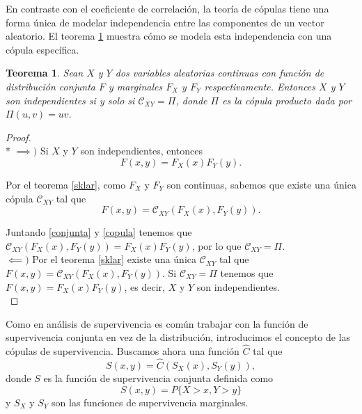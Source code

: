 \documentclass[11pt,a4paper]{article}
\newcommand{\C}{\mathcal{C}}
\newtheorem{theorem}{Teorema}[section]
\begin{document}
En contraste con el coeficiente de correlación, la teoría de cópulas tiene una forma única de modelar independencia entre las componentes de un vector aleatorio. El teorema \ref{independencia} muestra cómo se modela esta independencia con una cópula específica.\\

\begin{theorem}
\label{independencia}
Sean $X$ y $Y$ dos variables aleatorias continuas con función de distribución conjunta $F$ y marginales $F_X$ y $F_Y$ respectivamente. Entonces $X$ y $Y$ son independientes si y solo si $\C_{XY} = \Pi$, donde $\Pi$ es la cópula producto dada por $\Pi (u,v) = uv.$
\end{theorem}

\begin{proof}\mbox{}\\*
$\implies\big)$ Si $X$ y $Y$ son independientes, entonces
\begin{equation} \label{conjunta}
F(x, y) = F_X(x)F_Y(y).
\end{equation}

Por el teorema \ref{sklar}, como $F_X$ y $F_Y$ son continuas, sabemos que existe una única cópula $\C_{XY}$ tal que
\begin{equation} \label{copula}
F(x, y) = \C_{XY}(F_X(x), F_Y(y)).
\end{equation}

Juntando \eqref{conjunta} y \eqref{copula} tenemos que $\C_{XY}(F_X(x), F_Y(y)) = F_X(x)F_Y(y)$, por lo que $\C_{XY} = \Pi$.\\

$\impliedby \big)$ Por el teorema \ref{sklar} existe una única $\C_{XY}$ tal que $F(x, y) = \C_{XY}(F_X(x), F_Y(y))$. Si $\C_{XY} = \Pi$ tenemos que $F(x, y) = F_X(x)F_Y(y)$, es decir, $X$ y $Y$ son independientes.\\
\end{proof}

Como en análisis de supervivencia es común trabajar con la función de supervivencia conjunta en vez de la distribución, introducimos el concepto de las cópulas de supervivencia. Buscamos ahora una función $\widehat{C}$ tal que
\begin{equation} \label{suvcop}
S(x, y) = \widehat{C}(S_X(x), S_Y(y)),
\end{equation}
donde $S$ es la función de supervivencia conjunta definida como $$S(x, y ) = P\lbrace X>x, Y>y\rbrace$$ y $S_X$ y $S_Y$ son las funciones de supervivencia marginales.\\
\end{document}
